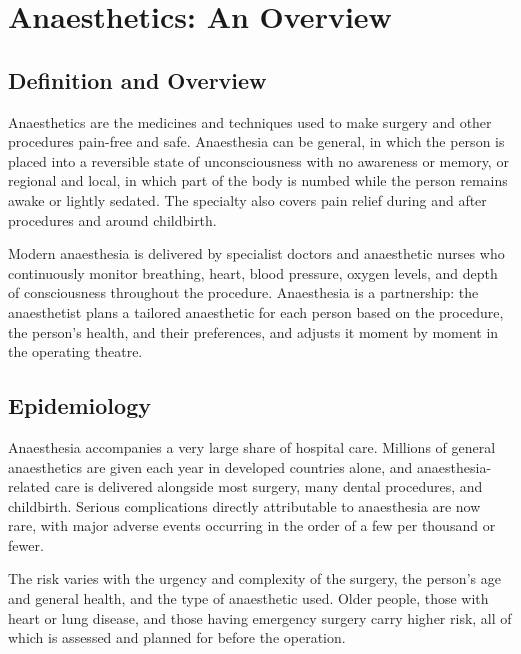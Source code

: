 \chapter{Anaesthetics: An Overview}

\section*{Definition and Overview}
Anaesthetics are the medicines and techniques used to make surgery and other procedures pain-free and safe. Anaesthesia can be general, in which the person is placed into a reversible state of unconsciousness with no awareness or memory, or regional and local, in which part of the body is numbed while the person remains awake or lightly sedated. The specialty also covers pain relief during and after procedures and around childbirth.

Modern anaesthesia is delivered by specialist doctors and anaesthetic nurses who continuously monitor breathing, heart, blood pressure, oxygen levels, and depth of consciousness throughout the procedure. Anaesthesia is a partnership: the anaesthetist plans a tailored anaesthetic for each person based on the procedure, the person's health, and their preferences, and adjusts it moment by moment in the operating theatre.

\section*{Epidemiology}
Anaesthesia accompanies a very large share of hospital care. Millions of general anaesthetics are given each year in developed countries alone, and anaesthesia-related care is delivered alongside most surgery, many dental procedures, and childbirth. Serious complications directly attributable to anaesthesia are now rare, with major adverse events occurring in the order of a few per thousand or fewer.

The risk varies with the urgency and complexity of the surgery, the person's age and general health, and the type of anaesthetic used. Older people, those with heart or lung disease, and those having emergency surgery carry higher risk, all of which is assessed and planned for before the operation.

